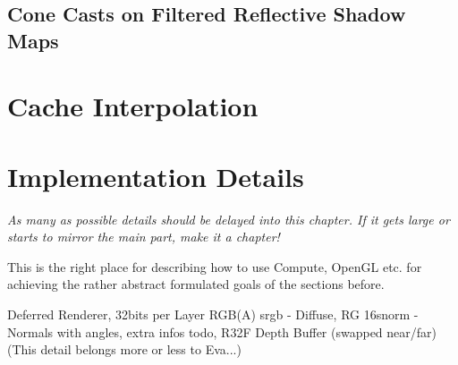 \documentclass[thesis.tex]{subfiles}
\begin{document}
\subsection{Cone Casts on Filtered Reflective Shadow Maps}


\section{Cache Interpolation}



\section{Implementation Details}

\emph{As many as possible details should be delayed into this chapter. If it gets large or starts to mirror the main part, make it a chapter!}

This is the right place for describing how to use Compute, OpenGL etc. for achieving the rather abstract formulated goals of the sections before.

Deferred Renderer, 32bits per Layer RGB(A) srgb - Diffuse, RG 16snorm - Normals with angles, extra infos todo, R32F Depth Buffer (swapped near/far)\\
(This detail belongs more or less to Eva...)

\subfilebib %
\end{document}
